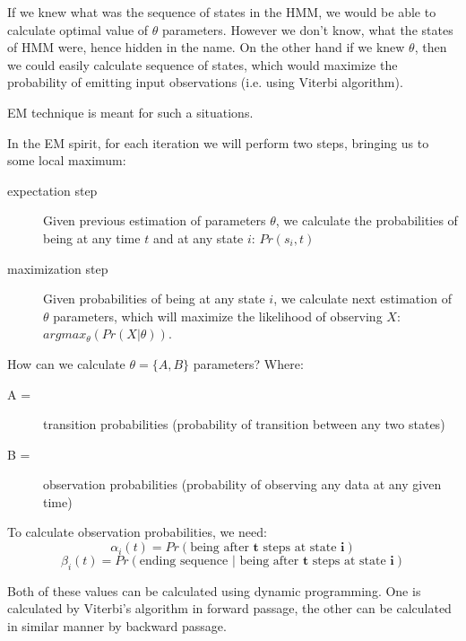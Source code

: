 \documentclass[12pt,a4paper,english]{article}
\begin{document}
If we knew what was the sequence of states in the HMM, we would be able to calculate optimal value of $\theta$ parameters. However we don't know, what the states of HMM were, hence hidden in the name. On the other hand if we knew $\theta$, then we could easily calculate sequence of states, which would maximize the probability of emitting input observations (i.e. using Viterbi algorithm). \newline

EM technique is meant for such a situations. \newline

In the EM spirit, for each iteration we will perform two steps, bringing us to some local maximum: \newline
\begin{description}
    \item[expectation step]
	Given previous estimation of parameters $\theta$, we calculate the probabilities of being at any time $t$ and at any state $i$: $Pr(s_i, t)$
    \item[maximization step]
	Given probabilities of being at any state $i$, we calculate next estimation of $\theta$ parameters, which will maximize the likelihood of observing $X$: $argmax_\theta(Pr(X | \theta))$.
\end{description}

How can we calculate $\theta = \{A, B\}$ parameters? \newline
Where:
\begin{description}
    \item[A =] transition probabilities (probability of transition between any two states)
	\item[B =] observation probabilities (probability of observing any data at any given time)
\end{description}

To calculate observation probabilities, we need:
\begin{equation}
    \alpha_i(t) = Pr(\text{being after $\boldsymbol{t}$ steps at state $\boldsymbol{i}$})
\end{equation}
\begin{equation}
    \beta_i(t) = Pr(\text{ending sequence $\boldsymbol{|}$ being after $\boldsymbol{t}$ steps at state $\boldsymbol{i}$})
\end{equation}

Both of these values can be calculated using dynamic programming. One is calculated by Viterbi's algorithm in forward passage, the other can be calculated in similar manner by backward passage.
\end{document}
